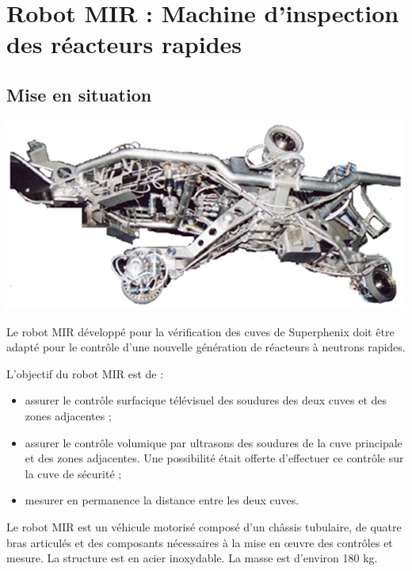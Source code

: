 \documentclass[10pt,fleqn]{article} %
\begin{document}



\section{Robot MIR : Machine d'inspection des réacteurs rapides}

\subsection{Mise en situation}

\begin{minipage}[c]{.25\linewidth}
\begin{center}
\includegraphics[width=.9\linewidth]{images/mir_01}
\end{center}
\end{minipage} \hfill
\begin{minipage}[c]{.7\linewidth}
Le robot MIR développé pour la vérification des cuves de Superphenix doit être adapté pour le contrôle d’une nouvelle génération de réacteurs à neutrons rapides.

L’objectif du robot MIR est de :
\begin{itemize}
\item assurer le contrôle surfacique télévisuel des soudures des deux cuves et des zones adjacentes ;
\item assurer le contrôle volumique par ultrasons des soudures de la cuve principale et des zones adjacentes. Une possibilité était offerte d’effectuer ce contrôle sur la cuve de sécurité ;
\item mesurer en permanence la distance entre les deux cuves.
\end{itemize}

\end{minipage} 

Le robot MIR est un véhicule motorisé composé d’un châssis tubulaire, de quatre bras articulés et des composants nécessaires à la mise en œuvre des contrôles et mesure. La structure est en acier inoxydable. La masse est d’environ 180 kg.
\end{document}
